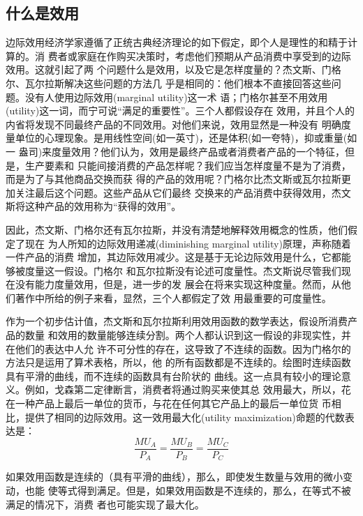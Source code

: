 \subsection{什么是效用}

边际效用经济学家遵循了正统古典经济理论的如下假定，即个人是理性的和精于计算的。消
费者或家庭在作购买决策时，考虑他们预期从产品消费中享受到的边际效用。这就引起了两
个问题什么是效用，以及它是怎样度量的？杰文斯、门格尔、瓦尔拉斯解决这些问题的方法几
乎是相同的：他们根本不直接回答这些问题。没有人使用边际效用(marginal utility)这一术
语；门格尔甚至不用效用(utility)这一词，而宁可说“满足的重要性”。三个人都假设存在
效用，并且个人的内省将发现不同最终产品的不同效用。对他们来说，效用显然是一种没有
明确度量单位的心理现象。是用线性空间(如一英寸)，还是体积(如一夸特)，抑或重量(如一
盎司)来度量效用？他们认为，效用是最终产品或者消费者产品的一个特征，但是，生产要素和
只能间接消费的产品怎样呢？我们应当怎样度量不是为了消费，而是为了与其他商品交换而获
得的产品的效用呢？门格尔比杰文斯或瓦尔拉斯更加关注最后这个问题。这些产品从它们最终
交换来的产品消费中获得效用，杰文斯将这种产品的效用称为“获得的效用”。

因此，杰文斯、门格尔还有瓦尔拉斯，并没有清楚地解释效用概念的性质，他们假定了现在
为人所知的边际效用递减(diminishing marginal utility)原理，声称随着一件产品的消费
增加，其边际效用减少。这是基于无论边际效用是什么，它都能够被度量这一假设。门格尔
和瓦尔拉斯没有论述可度量性。杰文斯说尽管我们现在没有能力度量效用，但是，进一步的发
展会在将来实现这种度量。然而，从他们著作中所给的例子来看，显然，三个人都假定了效
用最重要的可度量性。

作为一个初步估计值，杰文斯和瓦尔拉斯利用效用函数的数学表达，假设所消费产品的数量
和效用的数量能够连续分割。两个人都认识到这一假设的非现实性，并在他们的表达中人允
许不可分性的存在，这导致了不连续的函数。因为门格尔的方法只是运用了算术表格，所以，他
的所有函数都是不连续的。绘图时连续函数具有平滑的曲线，而不连续的函数具有台阶状的
曲线。这一点具有较小的理论意义。例如，戈森第二定律断言，消费者将通过购买来使其总
效用最大，所以，花在一种产品上最后一单位的货币，与花在任何其它产品上的最后一单位货
币相比，提供了相同的边际效用。这一效用最大化(utility maximization)命题的代数表达是：
\begin{equation}\label{eq:second}
  \frac{MU_A}{P_A} = \frac{MU_B}{P_B} = \frac{MU_C}{P_C}
\end{equation}

如果效用函数是连续的（具有平滑的曲线），那么，即使发生数量与效用的微小变动，也能
使等式得到满足。但是，如果效用函数是不连续的，那么，在等式不被满足的情况下，消费
者也可能实现了最大化。

